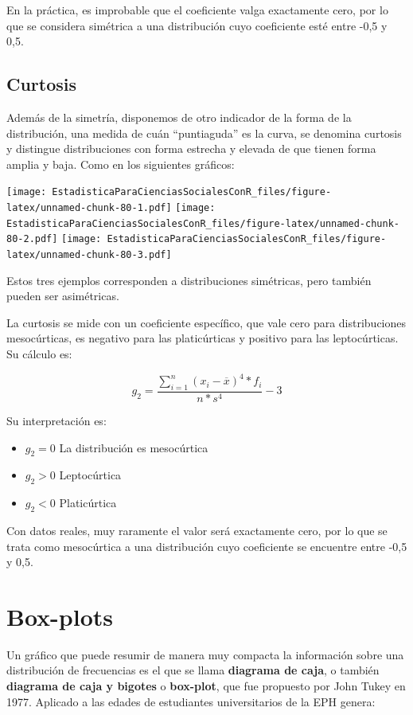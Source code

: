 \documentclass[]{book}
\begin{document}
En la práctica, es improbable que el coeficiente valga exactamente cero,
por lo que se considera simétrica a una distribución cuyo coeficiente
esté entre -0,5 y 0,5.

\hypertarget{curtosis}{%
\subsection{Curtosis}\label{curtosis}}

Además de la simetría, disponemos de otro indicador de la forma de la
distribución, una medida de cuán ``puntiaguda'' es la curva, se denomina
curtosis y distingue distribuciones con forma estrecha y elevada de que
tienen forma amplia y baja. Como en los siguientes gráficos:

\texttt{[image: EstadisticaParaCienciasSocialesConR\_files/figure-latex/unnamed-chunk-80-1.pdf]} \texttt{[image: EstadisticaParaCienciasSocialesConR\_files/figure-latex/unnamed-chunk-80-2.pdf]} \texttt{[image: EstadisticaParaCienciasSocialesConR\_files/figure-latex/unnamed-chunk-80-3.pdf]}

Estos tres ejemplos corresponden a distribuciones simétricas, pero
también pueden ser asimétricas.

La curtosis se mide con un coeficiente específico, que vale cero para
distribuciones mesocúrticas, es negativo para las platicúrticas y
positivo para las leptocúrticas. Su cálculo es:

\[g_{2} = \frac{\sum_{i = 1}^{n}{\left( x_{i} - \overline{x} \right)^{4}*f_{i}}}{n*s^{4}} - 3\]

Su interpretación es:

\begin{itemize}
\item
  \(g_{2} = 0\) La distribución es mesocúrtica
\item
  \(g_{2} > 0\) Leptocúrtica
\item
  \(g_{2} < 0\) Platicúrtica
\end{itemize}

Con datos reales, muy raramente el valor será exactamente cero, por lo
que se trata como mesocúrtica a una distribución cuyo coeficiente se
encuentre entre -0,5 y 0,5.

\hypertarget{box-plots}{%
\section{Box-plots}\label{box-plots}}

Un gráfico que puede resumir de manera muy compacta la información sobre
una distribución de frecuencias es el que se llama \textbf{diagrama de caja},
o también \textbf{diagrama de caja y bigotes} o \textbf{box-plot}, que fue
propuesto por John Tukey en 1977.
Aplicado a las edades de estudiantes universitarios de la EPH genera:
\end{document}
